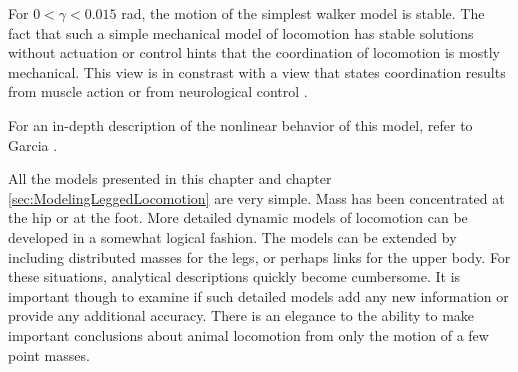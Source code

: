 For $0 < \gamma < 0.015$ rad, the motion of the simplest walker model is stable. The fact that such a simple mechanical model of locomotion has stable solutions without actuation or control hints that the coordination of locomotion is mostly mechanical. This view is in constrast with a view that states coordination results from muscle action or from neurological control \cite{garcia97}.

For an in-depth description of the nonlinear behavior of this model, 
refer to Garcia \cite{garcia97}.




All the models presented in this chapter and chapter \ref{sec:ModelingLeggedLocomotion} are very simple. Mass has been concentrated at the hip or at the foot. More detailed dynamic models of locomotion can be developed in a somewhat logical fashion. The models can be extended by including distributed masses for the legs, or perhaps links for the upper body. For these situations, analytical descriptions quickly become cumbersome. It is important though to examine if such detailed models add any new information or provide any additional accuracy. There is an elegance to the ability to make important conclusions about animal locomotion from only the motion of a few point masses.

